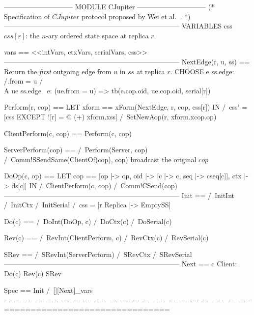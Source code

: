 \documentclass{article}
\begin{document}
\begin{tla}
------------------------------ MODULE CJupiter ------------------------------
(*
Specification of $CJupiter$ protocol proposed by Wei et al.~\cite{Wei:OPODIS18}.
*)
-----------------------------------------------------------------------------
VARIABLES css  \* $css[r]$: the $n$-ary ordered state space at replica $r$

vars == <<intVars, ctxVars, serialVars, css>>
-----------------------------------------------------------------------------
NextEdge(r, u, ss) == \* Return the \emph{first} outgoing edge from $u$ in $ss$ at replica $r$. 
    CHOOSE e \in ss.edge:
        /\e.from = u 
        /\\A ue \in ss.edge \ {e}: (ue.from = u) => tb(e.cop.oid, ue.cop.oid, serial[r])

Perform(r, cop) == 
    LET xform == xForm(NextEdge, r, cop, css[r])
    IN  /\ css' = [css EXCEPT ![r] = @ (+) xform.xss]
        /\ SetNewAop(r, xform.xcop.op)

ClientPerform(c, cop) == Perform(c, cop)

ServerPerform(cop) ==
    /\ Perform(Server, cop)
    /\ Comm!SSendSame(ClientOf(cop), cop)  \* broadcast the original $cop$

DoOp(c, op) == 
    LET cop == [op |-> op, oid |-> [c |-> c, seq |-> cseq[c]], ctx |-> ds[c]]
    IN  /\ ClientPerform(c, cop)
        /\ Comm!CSend(cop)
-----------------------------------------------------------------------------
Init == 
    /\ InitInt
    /\ InitCtx
    /\ InitSerial
    /\ css = [r \in Replica |-> EmptySS]

Do(c) == 
    /\ DoInt(DoOp, c) 
    /\ DoCtx(c)
    /\ DoSerial(c)

Rev(c) == 
    /\ RevInt(ClientPerform, c)
    /\ RevCtx(c)
    /\ RevSerial(c)

SRev == 
    /\ SRevInt(ServerPerform)
    /\ SRevCtx
    /\ SRevSerial
-----------------------------------------------------------------------------
Next == 
    \/ \E c \in Client: Do(c) \/ Rev(c)
    \/ SRev

Spec == Init /\ [][Next]_vars
=============================================================================
\end{tla}
\end{document}
